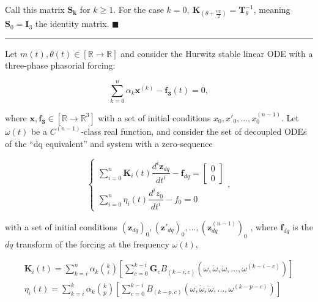 	Call this matrix $\mathbf{S_k}$ for $k\geq 1$. For the case $k = 0,\ \mathbf{K}_{\left(\theta + \frac{0\pi}{2}\right)} = \mathbf{T}^{-1}_{\theta}$, meaning $\mathbf{S}_0 = \mathbf{I}_3$ the identity matrix. \hfill$\blacksquare$
\vspace{5mm}
\hrule
\vspace{5mm}

\begin{theorem} \label{theo:3p_ode_solution}%

	Let $m\left(t\right),\theta\left(t\right)\in\left[\mathbb{R}\to\mathbb{R}\right]$ and consider the Hurwitz stable linear ODE with a three-phase phasorial forcing:

\begin{equation} \sum\limits_{k=0}^{n} \alpha_k \mathbf{x}^{\left(k\right)} - \mathbf{f_3}(t) = 0, \label{eq:theo_3p_ode_solution_original_ode}\end{equation}

	\noindent where $\mathbf{x},\mathbf{f_3}\in\left[\mathbb{R}\to\mathbb{R}^3\right]$ with a set of initial conditions $x_0,x'_0,...,x^{(n-1)}_0$. Let $\omega(t)$ be a $C^{\left(n-1\right)}$-class real function, and consider the set of decoupled ODEs of the ``dq equivalent'' and system with a zero-sequence

\begin{equation}
\left\{\begin{array}{l}
	\displaystyle \sum\limits_{i=0}^n \mathbf{K}_i (t) \dfrac{d^i \mathbf{z}_{dq}}{dt^i} - \mathbf{f}_{dq}  = \left[\begin{array}{c} 0 \\[3mm] 0 \end{array}\right]\\[5mm]
	\displaystyle \sum\limits_{i=0}^n \eta_i(t) \dfrac{d^i z_0}{dt^i} - f_0 = 0
\end{array}\right. , \label{eq:theo_3p_ode_solution_dq_equiv}
\end{equation}

	\noindent with a set of initial conditions $(\mathbf{z}_{dq})_0,(\mathbf{z}'_{dq})_0,...,(\mathbf{z}^{(n-1)}_{dq})_0$ , where $\mathbf{f}_{dq}$ is the $dq$ transform of the forcing at the frequency $\omega(t)$,

\begin{gather}
	\mathbf{K}_i(t) = \sum\limits_{k=i}^{n} \alpha_k{k\choose i} \left[\sum\limits_{c=0}^{k-i} \mathbf{G}_c B_{\left(k-i,c\right)}\left(\omega,\dot{\omega},\ddot{\omega},...,\omega^{(k-i-c)}\right) \right] \\[3mm]
	\eta_i(t) = \sum\limits_{k=i}^{k} \alpha_k {k\choose p} \left[\sum\limits_{c=0}^{k-i} B_{\left(k-p,c\right)}\left(\omega,\dot{\omega},\ddot{\omega},...,\omega^{(k-p-c)}\right)\right] 
\end{gather}


\end{theorem}
